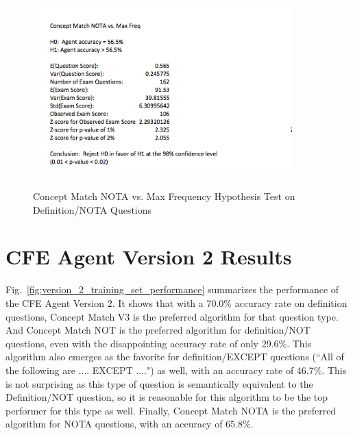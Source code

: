 \begin{figure}
\centering
\vspace{0.75in}
\includegraphics[width=100mm, height=75mm]{concept_match_nota_hypothesis_test.png}
\caption{Concept Match NOTA vs. Max Frequency Hypothesis Test on Definition/NOTA  Questions}
\label{fig:concept_match_nota_hypothesis_test}
\end{figure}





\section{CFE Agent Version 2 Results}

Fig.~\ref{fig:version_2_training_set_performance} summarizes the performance of the CFE Agent Version 2.  It shows that with a 70.0\% accuracy rate on definition questions, Concept Match V3 is the preferred algorithm for that question type.  And Concept Match NOT is the preferred algorithm for definition/NOT questions, even with the disappointing accuracy rate of only  29.6\%.  This algorithm also emerges as the favorite for definition/EXCEPT questions (``All of the following are .... EXCEPT ....") as well, with an accuracy rate of 46.7\%.  This is not surprising as this type of question is semantically equivalent to the Definition/NOT question, so it is reasonable for this algorithm to be the top performer for this type as well.  Finally, Concept Match NOTA is the preferred algorithm for NOTA questions, with an accuracy of 65.8\%.


